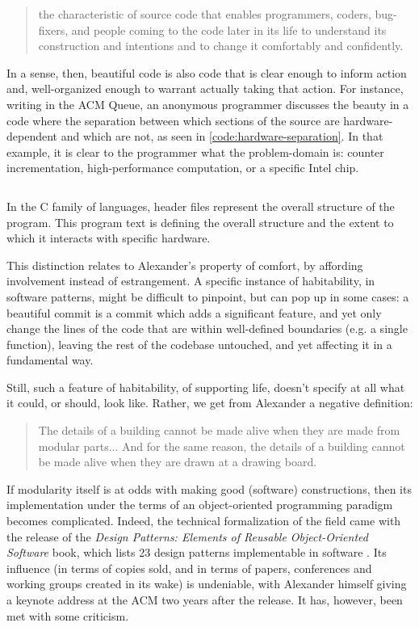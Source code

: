 \begin{quote}
    the characteristic of source code that enables programmers, coders, bug-fixers, and people coming to the code later in its life to understand its construction and intentions and to change it comfortably and confidently. \citep{gabriel_patterns_1998}
\end{quote}

In a sense, then, beautiful code is also code that is clear enough to inform action and, well-organized enough to warrant actually taking that action. For instance, writing in the ACM Queue, an anonymous programmer discusses the beauty in a code where the separation between which sections of the source are hardware-dependent and which are not, as seen in \ref{code:hardware-separation}. In that example, it is clear to the programmer what the problem-domain is: counter incrementation, high-performance computation, or a specific Intel chip.

\begin{listing}
    \inputminted{rust}{./corpus/hardware_separation.h}
    \caption{In the C family of languages, header files represent the overall structure of the program. This program text is defining the overall structure and the extent to which it interacts with specific hardware.}
    \label{code:hardware-separation}
\end{listing}

This distinction relates to Alexander's property of comfort, by affording involvement instead of estrangement. A specific instance of habitability, in software patterns, might be difficult to pinpoint, but can pop up in some cases: a beautiful commit is a commit which adds a significant feature, and yet only change the lines of the code that are within well-defined boundaries (e.g. a single function), leaving the rest of the codebase untouched, and yet affecting it in a fundamental way.

Still, such a feature of habitability, of supporting life, doesn't specify at all what it could, or should, look like. Rather, we get from Alexander a negative definition:

\begin{quote}
    The details of a building cannot be made alive when they are made from modular parts... And for the same reason, the details of a building cannot be made alive when they are drawn at a drawing board. \citep{alexander_timeless_1979}
\end{quote}

If modularity itself is at odds with making good (software) constructions, then its implementation under the terms of an object-oriented programming paradigm becomes complicated. Indeed, the technical formalization of the field came with the release of the \emph{Design Patterns: Elements of Reusable Object-Oriented Software} book, which lists 23 design patterns implementable in software \citep{gamma_design_1994}. Its influence (in terms of copies sold, and in terms of papers, conferences and working groups created in its wake) is undeniable, with Alexander himself giving a keynote address at the ACM two years after the release. It has, however, been met with some criticism.

